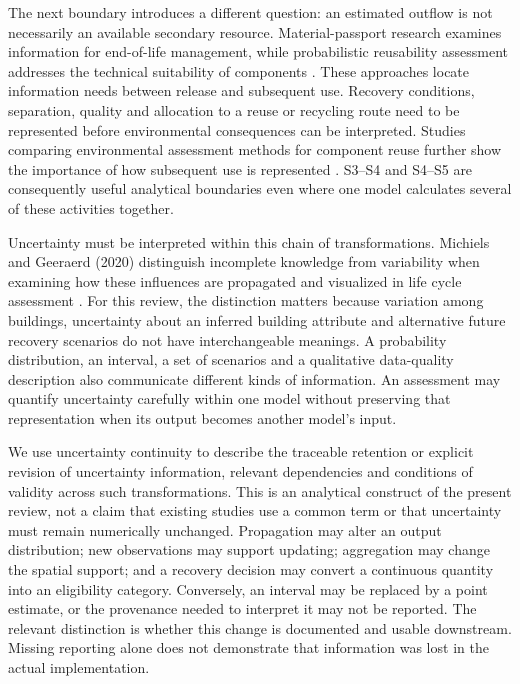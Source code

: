The next boundary introduces a different question: an estimated outflow is not necessarily an available secondary resource. Material-passport research examines information for end-of-life management, while probabilistic reusability assessment addresses the technical suitability of components \citep{I20,I21}. These approaches locate information needs between release and subsequent use. Recovery conditions, separation, quality and allocation to a reuse or recycling route need to be represented before environmental consequences can be interpreted. Studies comparing environmental assessment methods for component reuse further show the importance of how subsequent use is represented \citep{I22}. S3--S4 and S4--S5 are consequently useful analytical boundaries even where one model calculates several of these activities together.

Uncertainty must be interpreted within this chain of transformations. Michiels and Geeraerd (2020) distinguish incomplete knowledge from variability when examining how these influences are propagated and visualized in life cycle assessment \citep{I25}. For this review, the distinction matters because variation among buildings, uncertainty about an inferred building attribute and alternative future recovery scenarios do not have interchangeable meanings. A probability distribution, an interval, a set of scenarios and a qualitative data-quality description also communicate different kinds of information. An assessment may quantify uncertainty carefully within one model without preserving that representation when its output becomes another model's input.

We use uncertainty continuity to describe the traceable retention or explicit revision of uncertainty information, relevant dependencies and conditions of validity across such transformations. This is an analytical construct of the present review, not a claim that existing studies use a common term or that uncertainty must remain numerically unchanged. Propagation may alter an output distribution; new observations may support updating; aggregation may change the spatial support; and a recovery decision may convert a continuous quantity into an eligibility category. Conversely, an interval may be replaced by a point estimate, or the provenance needed to interpret it may not be reported. The relevant distinction is whether this change is documented and usable downstream. Missing reporting alone does not demonstrate that information was lost in the actual implementation.

